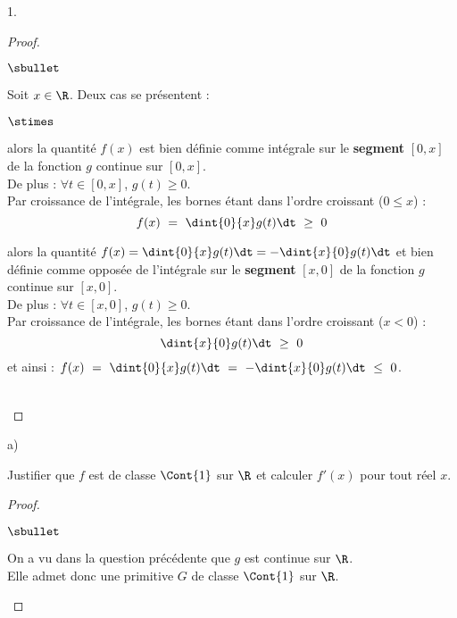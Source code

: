 \documentclass[11pt]{article}%
\begin{document}
\begin{noliste}{1.}
\begin{proof}
\begin{noliste}{$\sbullet$}
    \item Soit $x \in \R$. Deux cas se présentent :
      \begin{noliste}{$\stimes$}
      \item {} alors la quantité $f(x)$ est bien
        définie comme intégrale sur le {\bf segment} $[0, x]$ de la
        fonction $g$ continue sur $[0, x]$.\\
        De plus : $\forall t \in [0, x]$, $g(t) \geq 0$.\\[.2cm]
        Par croissance de l'intégrale, les bornes étant dans l'ordre
        croissant ($0 \leq x$) :
        \[
        f(x) \ = \ \dint{0}{x} g(t) \dt \ \geq \ 0
        \]

      \item {} alors la quantité $f(x) =
        \dint{0}{x} g(t) \dt = - \dint{x}{0} g(t) \dt$ et bien définie
        comme opposée de l'intégrale sur le {\bf segment} $[x, 0]$ de
        la fonction $g$ continue sur $[x, 0]$.\\
        De plus : $\forall t \in [x, 0]$, $g(t) \geq 0$.\\[.2cm]
        Par croissance de l'intégrale, les bornes étant dans l'ordre
        croissant ($x < 0$) :
        \[
        \dint{x}{0} g(t) \dt \ \geq \ 0
        \]
        et ainsi : $f(x) \ = \ \dint{0}{x} g(t) \dt \ = \ -
        \dint{x}{0} g(t) \dt \ \leq \ 0$. %
      \end{noliste}      
    \end{noliste}
    ~\\[-1.3cm]
  \end{proof}



  
  \begin{noliste}{a)}
    \setlength{\itemsep}{2mm} %
    \setcounter{enumii}{1}
  \item Justifier que $f$ est de classe $\Cont{1}$ sur $\R$ et
    calculer $f'(x)$ pour tout réel $x$.
    
    \begin{proof}~%
      \begin{noliste}{$\sbullet$}
      \item On a vu dans la question précédente que $g$ est continue
        sur $\R$.\\
        Elle admet donc une primitive $G$ de classe $\Cont{1}$ sur
        $\R$.


\end{noliste}
\end{proof}
\end{noliste}
\end{noliste}
\end{document}
